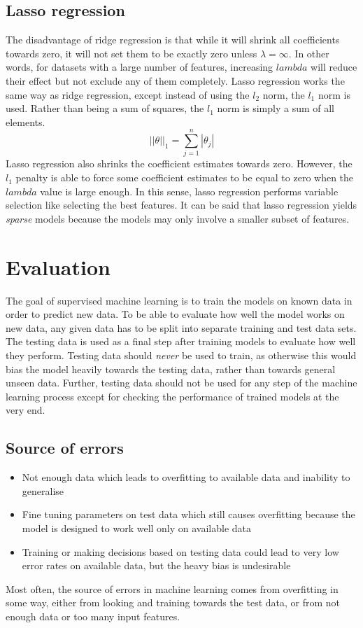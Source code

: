 \documentclass[CS5104-Notes.tex]{subfiles}
\begin{document}
\subsection{Lasso regression}
The disadvantage of ridge regression is that while it will shrink all coefficients towards zero, it will not set them to be exactly zero unless $\lambda = \infty$. In other words, for datasets with a large number of features, increasing $lambda$ will reduce their effect but not exclude any of them completely.
\n
Lasso regression works the same way as ridge regression, except instead of using the $l_{2}$ norm, the $l_{1}$ norm is used. Rather than being a sum of squares, the $l_{1}$ norm is simply a sum of all elements.
\begin{equation}
||\theta||_{1} = \sum_{j=1}^{n}|\theta_{j}|
\end{equation}
Lasso regression also shrinks the coefficient estimates towards zero. However, the $l_{1}$ penalty is able to force some coefficient estimates to be equal to zero when the $lambda$ value is large enough. In this sense, lasso regression performs variable selection like selecting the best features. It can be said that lasso regression yields \textit{sparse} models because the models may only involve a smaller subset of features. 
\section{Evaluation}
The goal of supervised machine learning is to train the models on known data in order to predict new data. To be able to evaluate how well the model works on new data, any given data has to be split into separate training and test data sets. The testing data is used as a final step after training models to evaluate how well they perform. Testing data should \textit{never} be used to train, as otherwise this would bias the model heavily towards the testing data, rather than towards general unseen data. Further, testing data should not be used for any step of the machine learning process except for checking the performance of trained models at the very end. 
\subsection{Source of errors}
\begin{itemize}
\item Not enough data which leads to overfitting to available data and inability to generalise
\item Fine tuning parameters on test data which still causes overfitting because the model is designed to work well only on available data
\item Training or making decisions based on testing data could lead to very low error rates on available data, but the heavy bias is undesirable
\end{itemize}
Most often, the source of errors in machine learning comes from overfitting in some way, either from looking and training towards the test data, or from not enough data or too many input features.
\end{document}
